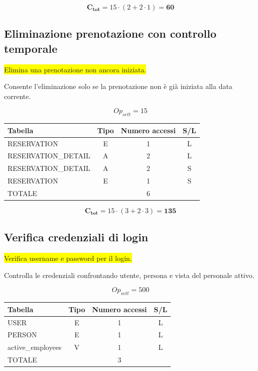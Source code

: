 \documentclass[a4paper,12pt]{report}
\begin{document}
$$\mathbf{C_{tot}} = 15 \cdot (2 + 2 \cdot 1) = \mathbf{60}$$

\subsection*{Eliminazione prenotazione con controllo temporale} \label{op18}
\colorbox{yellow}{Elimina una prenotazione non ancora iniziata.}

Consente l'eliminazione solo se la prenotazione non è già iniziata
alla data corrente.

$$Op_{sett} = 15$$

\begin{table}[H]
  \centering
  \small
  \renewcommand{\arraystretch}{1.15}
  \begin{tabularx}{0.8\textwidth}{|X|c|c|c|}
    \hline
    \rowcolor{gray!20}
    \textbf{Tabella} & \textbf{Tipo} & \textbf{Numero accessi} & \textbf{S/L} \\
    \hline
    RESERVATION & E & 1 & L \\
    RESERVATION\_DETAIL & A & 2 & L \\
    RESERVATION\_DETAIL & A & 2 & S \\
    RESERVATION & E & 1 & S \\
    \hline
    \rowcolor{gray!20}
    TOTALE & & 6 & \\
    \hline
  \end{tabularx}
  \vspace{-1em}
\end{table}

$$\mathbf{C_{tot}} = 15 \cdot (3 + 2 \cdot 3) = \mathbf{135}$$

\subsection*{Verifica credenziali di login} \label{op19}
\colorbox{yellow}{Verifica username e password per il login.}

Controlla le credenziali confrontando utente, persona e vista del
personale attivo.

$$Op_{sett} = 500$$

\begin{table}[H]
  \centering
  \small
  \renewcommand{\arraystretch}{1.15}
  \begin{tabularx}{0.8\textwidth}{|X|c|c|c|}
    \hline
    \rowcolor{gray!20}
    \textbf{Tabella} & \textbf{Tipo} & \textbf{Numero accessi} & \textbf{S/L} \\
    \hline
    USER & E & 1 & L \\
    PERSON & E & 1 & L \\
    active\_employees & V & 1 & L \\
    \hline
    \rowcolor{gray!20}
    TOTALE & & 3 & \\
    \hline
  \end{tabularx}
  \vspace{-1em}
\end{table}
\end{document}
